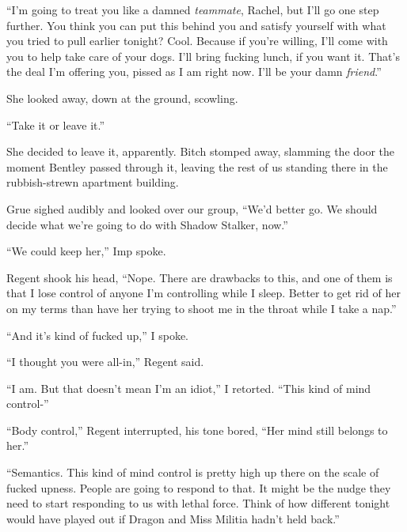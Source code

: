 ``I'm going to treat you like a damned \emph{teammate}, Rachel, but I'll go one step further.  You think you can put this behind you and satisfy yourself with what you tried to pull earlier tonight?  Cool.  Because if you're willing, I'll come with you to help take care of your dogs.  I'll bring fucking lunch, if you want it.  That's the deal I'm offering you, pissed as I am right now.  I'll be your damn \emph{friend}.''



She looked away, down at the ground, scowling.



``Take it or leave it.''



She decided to leave it, apparently.  Bitch stomped away, slamming the door the moment Bentley passed through it, leaving the rest of us standing there in the rubbish-strewn apartment building.



Grue sighed audibly and looked over our group, ``We'd better go.  We should decide what we're going to do with Shadow Stalker, now.''



``We could keep her,'' Imp spoke.



Regent shook his head, ``Nope.  There are drawbacks to this, and one of them is that I lose control of anyone I'm controlling while I sleep.  Better to get rid of her on my terms than have her trying to shoot me in the throat while I take a nap.''



``And it's kind of fucked up,'' I spoke.



``I thought you were all-in,'' Regent said.



``I am.  But that doesn't mean I'm an idiot,'' I retorted.  ``This kind of mind control-''



``Body control,'' Regent interrupted, his tone bored, ``Her mind still belongs to her.''



``Semantics.  This kind of mind control is pretty high up there on the scale of fucked upness.  People are going to respond to that.  It might be the nudge they need to start responding to us with lethal force.  Think of how different tonight would have played out if Dragon and Miss Militia hadn't held back.''



